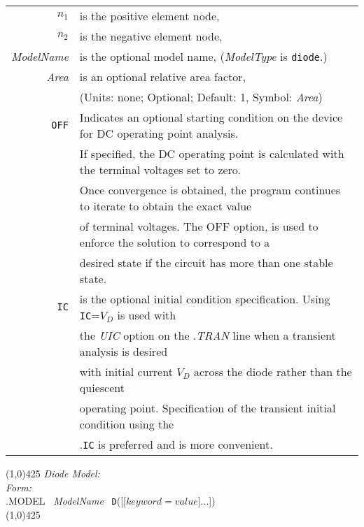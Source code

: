 \begin{tabular}{r l}
$n_1$ & is the positive element node, \\
$n_2$ & is the negative element node, \\
\textit{ModelName} & is the optional model name, (\textit{ModelType} is \texttt{diode}.)\\
\textit {Area} & is an optional relative area factor,  \\
                & (Units: none; Optional; Default: 1, Symbol:
                \textit{Area})\\
\texttt{OFF} & Indicates an optional starting condition on the device for DC operating point analysis.\\
             & If specified, the DC operating point is calculated with the terminal voltages set to zero.\\
             & Once convergence is obtained, the program continues to iterate to obtain the exact value\\
             & of terminal voltages. The OFF option, is used to enforce the solution to correspond to a \\
             & desired state if the circuit has more than one stable state.\\
\texttt{IC}  & is the optional initial condition specification. Using \texttt{IC}=$V_D$ is used with \\
             & the \textit{UIC} option on the .\textit{TRAN} line when a transient analysis is desired  \\
             & with initial current $V_D$ across the diode rather than the quiescent  \\
             & operating point. Specification of the transient initial condition using the  \\
             & .\texttt{IC} is preferred and is more convenient.
\end{tabular}
\newline
\linethickness{0.5mm} \line(1,0){425}
\newline
\textit{Diode Model:}\\
\textit{Form:}\\
.MODEL \ \textit{ModelName} \ \texttt{D}([[$\mathit{keyword} = \mathit{value}$]...])\\
\linethickness{0.5mm} \line(1,0){425}
\newline
